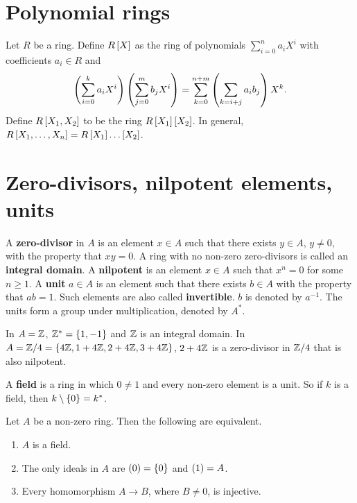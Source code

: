 \pagebreak

\section{Polynomial rings}

Let $ R $ be a ring. Define $ R\sb{X} $ as the ring of polynomials $ \sum_{i = 0}^n a_iX^i $ with coefficients $ a_i \in R $ and
$$ \rb{\sum_{i = 0}^k a_iX^i}\rb{\sum_{j = 0}^m b_jX^i} = \sum_{k = 0}^{n + m} \rb{\sum_{k = i + j} a_ib_j}X^k. $$
Define $ R\sb{X_1, X_2} $ to be the ring $ R\sb{X_1}\sb{X_2} $. In general, $ R\sb{X_1, \dots, X_n} = R\sb{X_1} \dots \sb{X_2} $.

\section{Zero-divisors, nilpotent elements, units}

\begin{definition}
A \textbf{zero-divisor} in $ A $ is an element $ x \in A $ such that there exists $ y \in A $, $ y \ne 0 $, with the property that $ xy = 0 $. A ring with no non-zero zero-divisors is called an \textbf{integral domain}. A \textbf{nilpotent} is an element $ x \in A $ such that $ x^n = 0 $ for some $ n \ge 1 $. A \textbf{unit} $ a \in A $ is an element such that there exists $ b \in A $ with the property that $ ab = 1 $. Such elements are also called \textbf{invertible}. $ b $ is denoted by $ a^{-1} $. The units form a group under multiplication, denoted by $ A^* $.
\end{definition}

\begin{example*}
In $ A = \Z $, $ \Z^* = \cb{1, -1} $ and $ \Z $ is an integral domain. In $ A = \Z / 4 = \cb{4\Z, 1 + 4\Z, 2 + 4\Z, 3 + 4\Z} $, $ 2 + 4\Z $ is a zero-divisor in $ \Z / 4 $ that is also nilpotent.
\end{example*}


\begin{definition}
A \textbf{field} is a ring in which $ 0 \ne 1 $ and every non-zero element is a unit. So if $ k $ is a field, then $ k \setminus \cb{0} = k^* $.
\end{definition}

\begin{proposition}
Let $ A $ be a non-zero ring. Then the following are equivalent.
\begin{enumerate}
\item $ A $ is a field.
\item The only ideals in $ A $ are $ \rb{0} = \cb{0} $ and $ \rb{1} = A $.
\item Every homomorphism $ A \to B $, where $ B \ne 0 $, is injective.
\end{enumerate}
\end{proposition}

